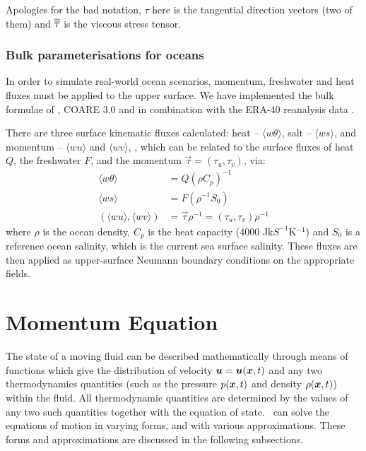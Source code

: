 Apologies for the bad notation, $\tau$ here is the tangential direction
vectors (two of them) and $\overline{\overline{\tau}}$ is the viscous stress tensor.

\subsubsection{Bulk parameterisations for oceans}

In order to simulate real-world ocean scenarios, momentum, freshwater and heat fluxes 
must be applied to the upper surface. We have implemented the bulk formulae of \citet{large2004},
COARE 3.0 \citep{fairall2003} and \citet{kara2005} in combination with the ERA-40 reanalysis data \citep{Uppala2005}.

There are three surface kinematic fluxes calculated: heat -- $\langle w\theta \rangle$,
salt -- $\langle ws \rangle$, and momentum -- $\langle wu \rangle$ and $\langle wv \rangle$,
, which can be related to the surface fluxes of heat $Q$, the
freshwater $F$, and the momentum $\overrightarrow\tau=\left(\tau_u,\tau_v\right)$, via:
\begin{align}
\langle w\theta \rangle &= Q\left(\rho C_p \right)^{-1} \\
\langle ws \rangle &= F\left(\rho^{-1}S_0\right) \\
\left(\langle wu \rangle, \langle wv \rangle\right) &=
\overrightarrow{\tau}\rho^{-1} =
\left(\tau_u,\tau_v\right)\rho^{-1}
\end{align}
where $\rho$ is the ocean density, $C_p$ is the heat capacity (4000 Jk$S^{-1}$K$^{-1}$) 
and $S_0$ is a reference ocean salinity, which is the current sea surface salinity. 
These fluxes are then applied as upper-surface Neumann boundary conditions on
the appropriate fields.


\section{Momentum Equation}\label{Sect:MP-MomEqn}

The state of a moving fluid can be described mathematically through means of
functions which give the distribution of velocity ${\mbox{\boldmath$u$}}={\mbox{\boldmath$u$}}({\mbox{\boldmath$x$}},t)$ and
any two thermodynamics quantities (such as the pressure $p({\mbox{\boldmath$x$}},t)$ and
density $\rho({\mbox{\boldmath$x$}},t)$) within the fluid. All thermodynamic quantities are
determined by the values of any two such quantities together with the
equation of state. \fluidity\ can solve the equations of motion in varying forms, and
with various approximations. These forms and approximations are discussed in
the following subsections.

